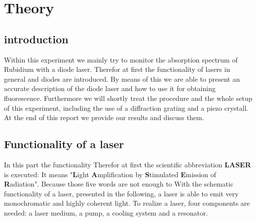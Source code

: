 \section{Theory}
\label{sec:theory}

\subsection{introduction}

Within this experiment we mainly try to monitor the absorption spectrum of Rubidium with a diode laser.
Therefor at first the functionality of lasers in general and diodes are introduced.
By means of this we are able to present an accurate description of the diode laser and how to
use it for obtaining fluorescence.
Furthermore we will shortly treat the procedure and the whole setup of this experiment, including
the use of a diffraction grating and a piezo crystall.
At the end of this report we provide our results and discuss them.

\subsection{Functionality of a laser}
\label{sec:laser}

In this part the functionality
Therefor at first the scientific abbreviation \textbf{LASER} is executed: It means "\textbf{L}ight \textbf{A}mplification by \textbf{S}timulated \textbf{E}mission of \textbf{R}adiation".
Because those five words are not enough to 
With the schematic functionality of a laser, presented in the following, a laser is able to emit
very monochromatic and highly coherent light. To realize a laser, four components are needed: a laser medium, a pump, a cooling system and a resonator.

